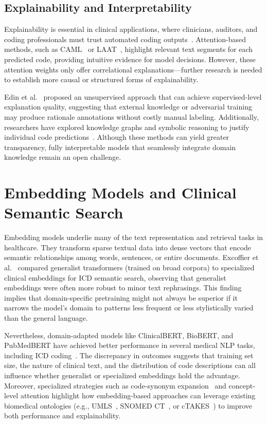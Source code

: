 \subsection{ Explainability and Interpretability}

Explainability is essential in clinical applications, where clinicians, auditors, and coding professionals must trust automated coding outputs~\citep{holzinger2017we}. Attention-based methods, such as CAML~\citep{mullenbach2018explainable} or LAAT~\citep{vu2020label}, highlight relevant text segments for each predicted code, providing intuitive evidence for model decisions. However, these attention weights only offer correlational explanations—further research is needed to establish more causal or structured forms of explainability.

Edin et al.~\citep{edin2024unsupervised} proposed an unsupervised approach that can achieve supervised-level explanation quality, suggesting that external knowledge or adversarial training may produce rationale annotations without costly manual labeling. Additionally, researchers have explored knowledge graphs and symbolic reasoning to justify individual code predictions~\citep{teng2020explainable}. Although these methods can yield greater transparency, fully interpretable models that seamlessly integrate domain knowledge remain an open challenge.

\section{Embedding Models and Clinical Semantic Search}

Embedding models underlie many of the text representation and retrieval tasks in healthcare. They transform sparse textual data into dense vectors that encode semantic relationships among words, sentences, or entire documents. Excoffier et al.~\citep{excoffier2024generalist} compared generalist transformers (trained on broad corpora) to specialized clinical embeddings for ICD semantic search, observing that generalist embeddings were often more robust to minor text rephrasings. This finding implies that domain-specific pretraining might not always be superior if it narrows the model’s domain to patterns less frequent or less stylistically varied than the general language.

Nevertheless, domain-adapted models like ClinicalBERT, BioBERT, and PubMedBERT have achieved better performance in several medical NLP tasks, including ICD coding~\citep{gao2021limitations, ji2021bert}. The discrepancy in outcomes suggests that training set size, the nature of clinical text, and the distribution of code descriptions can all influence whether generalist or specialized embeddings hold the advantage. Moreover, specialized strategies such as code-synonym expansion~\citep{yuan2022codesynonyms} and concept-level attention highlight how embedding-based approaches can leverage existing biomedical ontologies (e.g., UMLS~\citep{bodenreider2004umls}, SNOMED CT~\citep{donnelly2006snomedct}, or cTAKES~\citep{savova2010ctakes}) to improve both performance and explainability.

